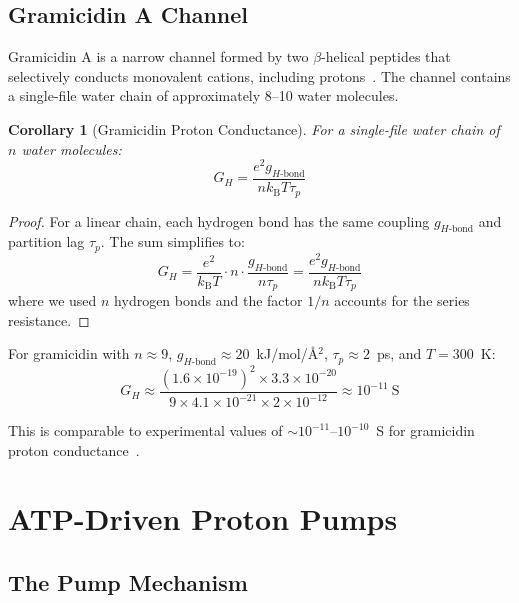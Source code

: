 \documentclass[twocolumn,showpacs,preprintnumbers,amsmath,amssymb,prd]{revtex4-2}
\newtheorem{corollary}[theorem]{Corollary}
\newcommand{\taup}{\tau_p}
\newcommand{\Hbond}{H\text{-bond}}
\newcommand{\kB}{k_{\text{B}}}
\begin{document}
\subsection{Gramicidin A Channel}

Gramicidin A is a narrow channel formed by two $\beta$-helical peptides that selectively conducts monovalent cations, including protons~\cite{Hille2001}. The channel contains a single-file water chain of approximately 8--10 water molecules.

\begin{corollary}[Gramicidin Proton Conductance]
\label{cor:gramicidin}
For a single-file water chain of $n$ water molecules:
\begin{equation}
G_H = \frac{e^2 g_{\Hbond}}{n \kB T \taup}
\label{eq:gramicidin_conductance}
\end{equation}
\end{corollary}

\begin{proof}
For a linear chain, each hydrogen bond has the same coupling $g_{\Hbond}$ and partition lag $\taup$. The sum simplifies to:
\begin{equation}
G_H = \frac{e^2}{\kB T} \cdot n \cdot \frac{g_{\Hbond}}{n \taup} = \frac{e^2 g_{\Hbond}}{n \kB T \taup}
\end{equation}
where we used $n$ hydrogen bonds and the factor $1/n$ accounts for the series resistance.
\end{proof}

For gramicidin with $n \approx 9$, $g_{\Hbond} \approx 20$~kJ/mol/\AA$^2$, $\taup \approx 2$~ps, and $T = 300$~K:
\begin{equation}
G_H \approx \frac{(1.6 \times 10^{-19})^2 \times 3.3 \times 10^{-20}}{9 \times 4.1 \times 10^{-21} \times 2 \times 10^{-12}} \approx 10^{-11}~\text{S}
\end{equation}

This is comparable to experimental values of $\sim 10^{-11}$--$10^{-10}$~S for gramicidin proton conductance~\cite{Chernyshev2003}.


\section{ATP-Driven Proton Pumps}
\label{sec:pumps}

\subsection{The Pump Mechanism}
\end{document}
